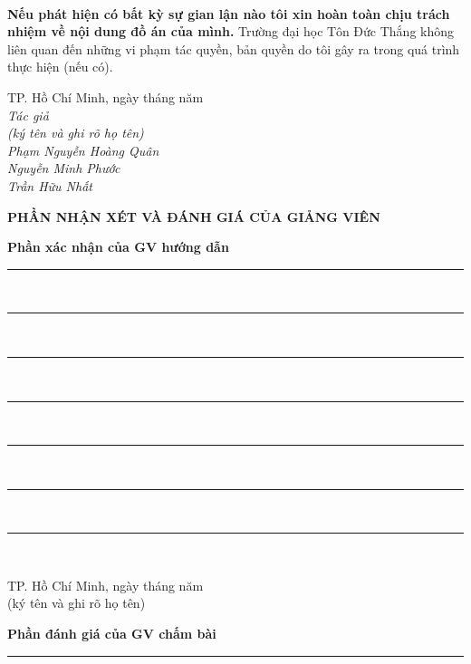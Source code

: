 \documentclass{report}
\newcommand\tab[1][1.25cm]{\hspace*{#1}}
\begin{document}
\paragraph{}
\textbf{Nếu phát hiện có bất kỳ sự gian lận nào tôi xin hoàn toàn chịu trách nhiệm về nội dung đồ án của mình.} Trường đại học Tôn Đức Thắng không liên quan đến những vi phạm tác quyền, bản quyền do tôi gây ra trong quá trình thực hiện (nếu có).
\begin{flushright}
	TP. Hồ Chí Minh, ngày \tab[1cm] tháng \tab[1cm] năm \tab[1cm]\tab \\
	\textit{Tác giả \tab\tab\tab\tab\tab\\
		(ký tên và ghi rõ họ tên)\tab[3cm] \\
		\vspace{1.5cm}
		Phạm Nguyễn Hoàng Quân\tab\quad \tab\quad\\
		\vspace{1.5cm}
		Nguyễn Minh Phước\tab\quad \tab\quad\\
		\vspace{1.5cm}
		Trần Hữu Nhất\tab\quad \tab\quad\\}
\end{flushright}
\pagebreak
\begin{center}
	\fontsize{16}{20}\selectfont
	\textbf{PHẦN NHẬN XÉT VÀ ĐÁNH GIÁ CỦA GIẢNG VIÊN}\\
\end{center}
\fontsize{13}{14}\selectfont
\textbf{Phần xác nhận của GV hướng dẫn}\\
\rule{17cm}{1pt}\\
\rule{17cm}{1pt}\\
\rule{17cm}{1pt}\\
\rule{17cm}{1pt}\\
\rule{17cm}{1pt}\\
\rule{17cm}{1pt}\\
\rule{17cm}{1pt}\\
\begin{flushright}
	TP. Hồ Chí Minh, ngày \tab[1cm] tháng \tab[1cm] năm \tab[1cm]\tab \\
	(ký tên và ghi rõ họ tên)\tab[2cm] \\
	\vspace{2cm}
\end{flushright}
\fontsize{13}{14}\selectfont
\textbf{Phần đánh giá của GV chấm bài}\\
\rule{17cm}{1pt}\\
\end{document}
